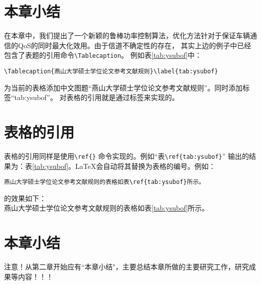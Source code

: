 \section{本章小结}\label{section3-5}
在本章中，我们提出了一个新颖的鲁棒功率控制算法，优化方法针对于保证车辆通信的QoS的同时最大化效用。由于信道不确定性的存在，
其实上边的例子中已经包含了表题的引用命令\verb|\Tablecaption|。
例如表\ref{tab:ysubof}中：
\begin{verbatim}
\Tablecaption{燕山大学硕士学位论文参考文献规则}\label{tab:ysubof}
\end{verbatim}
为当前的表格添加中文图题“燕山大学硕士学位论文参考文献规则”。同时添加标签“tab:ysubof”。 对表格的引用就是通过标签来实现的。

\section{表格的引用}\label{section3-6}
表格的引用同样是使用\verb|\ref{}| 命令实现的。例如“表\verb|\ref{tab:ysubof}|” 输出的结果为：表\ref{tab:ysubof}。\LaTeX 会自动将其替换为表格的编号。例如：
\begin{verbatim}
燕山大学硕士学位论文参考文献规则的表格如表\ref{tab:ysubof}所示。
\end{verbatim}
的效果如下：\\
燕山大学硕士学位论文参考文献规则的表格如表\ref{tab:ysubof}所示。

\section{本章小结}\label{section3-7}
注意！从第二章开始应有``本章小结"，主要总结本章所做的主要研究工作，研究成果等内容！！！

%
